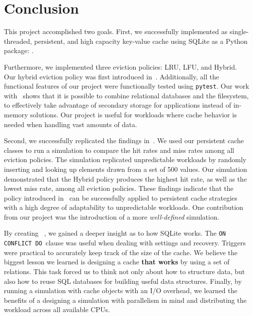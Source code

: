 \section{Conclusion}
This project accomplished two goals. First,
we successfully implemented as single-threaded,
persistent, and high capacity key-value cache using
SQLite as a Python package: \sqlitecache.

Furthermore,
we implemented three eviction policies:
LRU, LFU, and Hybrid. Our hybrid eviction
policy was first introduced in~\cite{shah2023ImprovedCacheEviction}.
Additionally, all the functional features of our project
were functionally tested using \texttt{pytest}.
Our work with \sqlitecache~shows that it is possible to combine
relational databases and the filesystem, to effectively
take advantage of secondary storage for applications instead
of in-memory solutions. Our project is useful for workloads
where cache behavior is needed when handling
vast amounts of data.

Second, we successfully replicated the findings in~\cite{shah2023ImprovedCacheEviction}.
We used our persistent cache classes
to run a simulation to compare the hit rates and miss rates
among all eviction policies. The simulation
replicated unpredictable workloads by randomly inserting
and looking up elements drawn from a set of 500 values.
Our simulation demonstrated that the Hybrid policy
produces the highest hit rate, as well
as the lowest miss rate, among all eviction policies.
These findings indicate that the policy introduced in~\cite{shah2023ImprovedCacheEviction}
can be successfully applied to persistent cache strategies
with a high degree of adaptability to unpredictable workloads.
One contribution from our project was the introduction
of a more \textit{well-defined} simulation.

By creating \sqlitecache~, we gained a deeper insight
as to how SQLite works. The \texttt{ON CONFLICT DO}~clause
was useful when dealing with settings and recovery.
Triggers were practical to accurately keep track
of the size of the cache. We believe the biggest
lesson we learned is designing a cache \textbf{that works}
by using
a set of relations. This task forced us to think
not only about how to structure data, but also how to
reuse SQL databases for building useful data structures.
Finally, by
running a simulation with cache objects
with an I/O overhead, we learned the benefits
of a designing a simulation with parallelism in mind
and distributing the workload across all
available CPUs.

